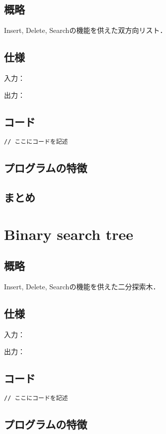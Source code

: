 \documentclass{ltjsarticle}
\begin{document}
\subsection{概略}
Insert, Delete, Searchの機能を供えた双方向リスト．

\subsection{仕様}
\noindent 入力：

\noindent 出力：

\subsection{コード}
\begin{lstlisting}[frame=single, lineskip=-5pt]
// ここにコードを記述
\end{lstlisting}

\subsection{プログラムの特徴}

\subsection{まとめ}

\section{Binary search tree}
\subsection{概略}
Insert, Delete, Searchの機能を供えた二分探索木．

\subsection{仕様}
\noindent 入力：

\noindent 出力：

\subsection{コード}
\begin{lstlisting}[frame=single, lineskip=-5pt]
// ここにコードを記述
\end{lstlisting}

\subsection{プログラムの特徴}
\end{document}
